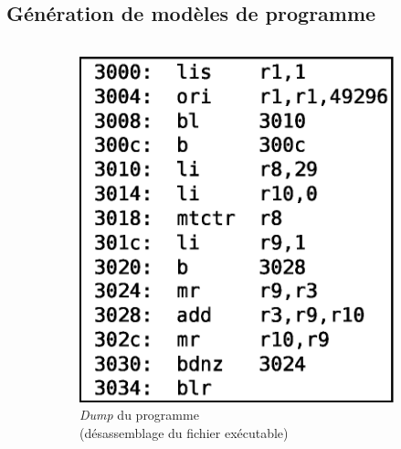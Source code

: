 \documentclass[final]{beamer}
\begin{document}
\begin{frame}
    \section{Génération de modèles de programme}
    \begin{columns}[t]      
      \begin{column}{.594\linewidth}
        \begin{figure}[ht]
          \centering
          \begin{subfigure}{.30\textwidth}
            \centering
            \includegraphics{img/dump-new.eps}
            \captionsetup{justification=centering}
            \caption{\emph{Dump} du programme \\
              (désassemblage du fichier exécutable)}
            \label{fig:dump}
          \end{subfigure}
          \hspace{.25em}
          \begin{subfigure}{.30\textwidth}
            \centering

\end{subfigure}
\end{figure}
\end{column}
\end{columns}
\end{frame}
\end{document}
